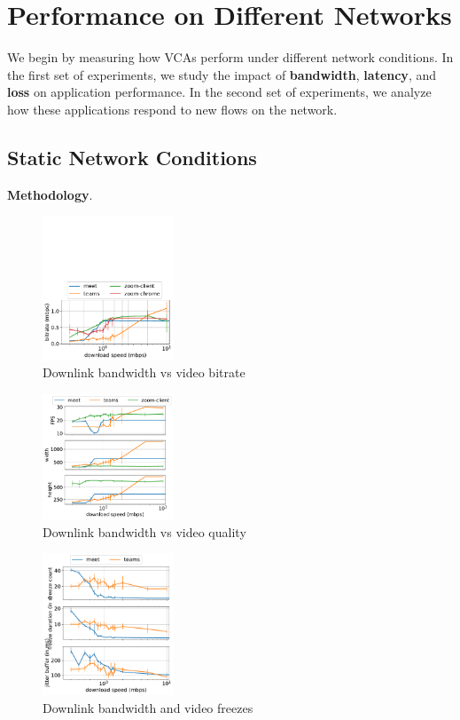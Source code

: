 \section{Performance on Different Networks}\label{sec:methodology}
We begin by measuring how VCAs perform under different network conditions. 
In the first set of experiments, we study the impact of \textbf{bandwidth}, \textbf{latency}, 
and \textbf{loss} on application performance. In the second set of experiments, 
we analyze how these applications respond to new flows on the network.
\subsection{Static Network Conditions}


\noindent\textbf{Methodology}. 


\begin{figure}[]
    \includegraphics[width=0.35\textwidth,keepaspectratio]{figures/static/downlink_bitrate_meet_teams_zoom.pdf}
    \caption{Downlink bandwidth vs video bitrate}
	\label{fig:downlink_video_bitrate}
\end{figure}


\begin{figure}[]
    \includegraphics[width=0.35\textwidth,keepaspectratio]{figures/static/downlink_video_qual_meet_teams_zoom.pdf}
    \caption{Downlink bandwidth vs video quality}
    \label{fig:downlink_video_qual}
\end{figure}


\begin{figure}[]
    \includegraphics[width=0.35\textwidth,keepaspectratio]{figures/static/downlink_freeze_meet_teams.pdf}
    \caption{Downlink bandwidth and video freezes}
    \label{fig:downlink_freeze}
\end{figure}


